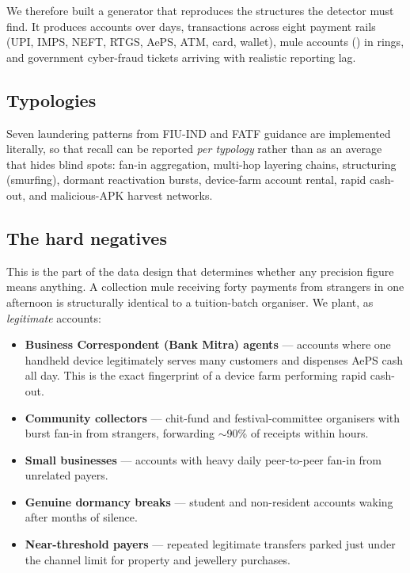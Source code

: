 \documentclass{article}
\begin{document}
We therefore built a generator that reproduces the structures the detector must
find. It produces \dsAccounts{} accounts over \dsDays{} days,
\dsTransactions{} transactions across eight payment rails (UPI, IMPS, NEFT,
RTGS, AePS, ATM, card, wallet), \dsMules{} mule accounts (\dsMuleRate{}) in
\dsRings{} rings, and \dsTickets{} government cyber-fraud tickets arriving with
realistic reporting lag.

\subsection{Typologies}

Seven laundering patterns from FIU-IND and FATF guidance are implemented
literally, so that recall can be reported \emph{per typology} rather than as an
average that hides blind spots: fan-in aggregation, multi-hop layering chains,
structuring (smurfing), dormant reactivation bursts, device-farm account rental,
rapid cash-out, and malicious-APK harvest networks.

\subsection{The hard negatives}

This is the part of the data design that determines whether any precision figure
means anything. A collection mule receiving forty payments from strangers in one
afternoon is structurally identical to a tuition-batch organiser. We plant, as
\emph{legitimate} accounts:

\begin{itemize}
\item \textbf{Business Correspondent (Bank Mitra) agents} ---
\decoyBcAgentDeviceClusterN{} accounts where one handheld device legitimately
serves many customers and dispenses AePS cash all day. This is the exact
fingerprint of a device farm performing rapid cash-out.
\item \textbf{Community collectors} --- \decoyCommunityCollectorN{} chit-fund and
festival-committee organisers with burst fan-in from strangers, forwarding
$\sim$90\% of receipts within hours.
\item \textbf{Small businesses} --- \decoySmallBusinessFanInN{} accounts with
heavy daily peer-to-peer fan-in from unrelated payers.
\item \textbf{Genuine dormancy breaks} --- \decoyLegitimateDormantWakeN{} student
and non-resident accounts waking after months of silence.
\item \textbf{Near-threshold payers} --- repeated legitimate transfers parked
just under the channel limit for property and jewellery purchases.
\end{itemize}
\end{document}
